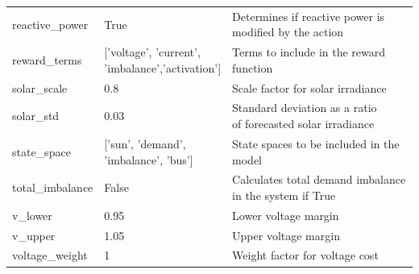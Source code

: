 \documentclass[class=book, crop=false, 11pt]{standalone}
\begin{document}
{\begin{table}[ht]
\begin{tabular}{lll}
reactive\_power    & True                                                 & \makecell[l]{Determines if reactive power is \\ modified by the action}       \\
reward\_terms      & \makecell[l]{{[}’voltage’, ’current’,\\ ’imbalance’,’activation’{]}} & Terms to include in the reward function                      \\
solar\_scale       & 0.8                                                  & Scale factor for solar irradiance                            \\
solar\_std         & 0.03                                                 & \makecell[l]{Standard deviation as a ratio \\ of forecasted solar irradiance} \\
state\_space       & \makecell[l]{{[}’sun’, ’demand’, \\ ’imbalance’, 'bus'{]}}            & State spaces to be included in the model                     \\
total\_imbalance   & False                                                & \makecell[l]{Calculates total demand imbalance \\ in the system if True}      \\
v\_lower           & 0.95                                                 & Lower voltage margin                                         \\
v\_upper           & 1.05                                                 & Upper voltage margin                                         \\
voltage\_weight    & 1                                                    & Weight factor for voltage cost                              \\
\hline
\end{tabular}
\label{table:implementation:param_description}
\end{table}
}
\end{document}
